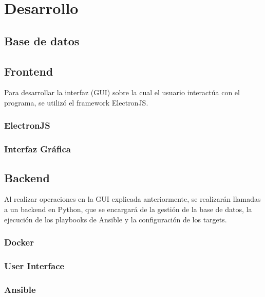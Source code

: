 \chapter{Desarrollo}
\label{ch:desarrollo}

\section{Base de datos}


\section{Frontend}
Para desarrollar la interfaz (GUI) sobre la cual el usuario interactúa con el programa, se utilizó el framework ElectronJS\cite{ElectronJS}. 
\subsection{ElectronJS}


\subsection{Interfaz Gráfica}
% 

\section{Backend}
Al realizar operaciones en la GUI explicada anteriormente, se realizarán llamadas a un backend en Python, que se encargará de la gestión de la base de datos, la ejecución de los playbooks de Ansible y la configuración de los targets.
\subsection{Docker}


\subsection{User Interface}
% 

\subsection{Ansible}


